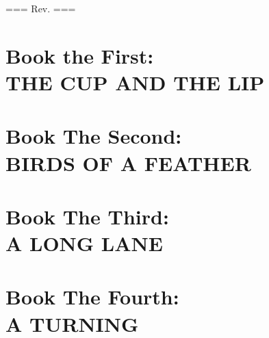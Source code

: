 \documentclass[12pt]{book}
\begin{document}
\noindent
=== Rev. \rev ===

\newpage


\part{Book the First:\\THE CUP AND THE LIP}



















\part{Book The Second:\\BIRDS OF A FEATHER}


















\part{Book The Third:\\A LONG LANE}



















\part{Book The Fourth:\\A TURNING}


















\end{document}
